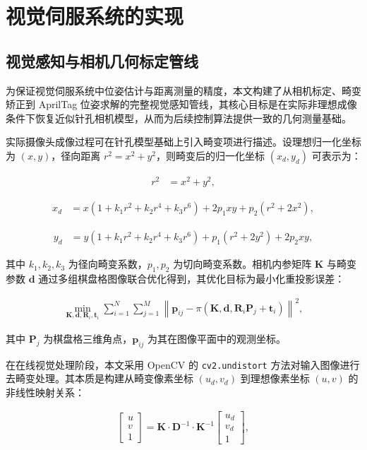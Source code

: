 \section{视觉伺服系统的实现}
\subsection{视觉感知与相机几何标定管线}

为保证视觉伺服系统中位姿估计与距离测量的精度，本文构建了从相机标定、畸变矫正到 AprilTag 位姿求解的完整视觉感知管线，其核心目标是在实际非理想成像条件下恢复近似针孔相机模型，从而为后续控制算法提供一致的几何测量基础。

实际摄像头成像过程可在针孔模型基础上引入畸变项进行描述。设理想归一化坐标为 $(x, y)$，径向距离 $r^2 = x^2 + y^2$，则畸变后的归一化坐标 $(x_d, y_d)$ 可表示为：

\begin{align}
r^2 &= x^2 + y^2,
\end{align}

\begin{align}
x_d &= x \left(1 + k_1 r^2 + k_2 r^4 + k_3 r^6 \right) + 2p_1xy + p_2(r^2 + 2x^2),
\end{align}

\begin{align}
y_d &= y \left(1 + k_1 r^2 + k_2 r^4 + k_3 r^6 \right) + p_1(r^2 + 2y^2) + 2p_2xy,
\end{align}

其中 $k_1, k_2, k_3$ 为径向畸变系数，$p_1, p_2$ 为切向畸变系数。相机内参矩阵 $\mathbf{K}$ 与畸变参数 $\mathbf{d}$ 通过多组棋盘格图像联合优化得到，其优化目标为最小化重投影误差：

\begin{align}
\min_{\mathbf{K}, \mathbf{d}, \mathbf{R}_i, \mathbf{t}_i}
\sum_{i=1}^{N} \sum_{j=1}^{M}
\left\| \mathbf{p}_{ij} - \pi\left(\mathbf{K}, \mathbf{d}, \mathbf{R}_i \mathbf{P}_j + \mathbf{t}_i \right) \right\|^2,
\end{align}

其中 $\mathbf{P}_j$ 为棋盘格三维角点，$\mathbf{p}_{ij}$ 为其在图像平面中的观测坐标。

在在线视觉处理阶段，本文采用 OpenCV 的 \texttt{cv2.undistort} 方法对输入图像进行去畸变处理。其本质是构建从畸变像素坐标 $(u_d, v_d)$ 到理想像素坐标 $(u, v)$ 的非线性映射关系：

\begin{align}
\begin{bmatrix}
u \\
v \\
1
\end{bmatrix}
=
\mathbf{K}
\cdot
\mathbf{D}^{-1}
\cdot
\mathbf{K}^{-1}
\begin{bmatrix}
u_d \\
v_d \\
1
\end{bmatrix},
\end{align}

